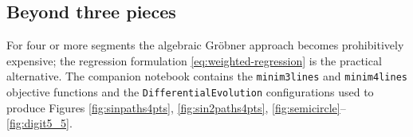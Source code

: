 \documentclass[12pt,english]{article}
\theoremstyle{remark}
\begin{document}
\subsection{Beyond three pieces}

For four or more segments the algebraic Gröbner approach becomes prohibitively
expensive; the regression formulation \eqref{eq:weighted-regression}
is the practical alternative. The companion notebook contains the
\texttt{minim3lines} and \texttt{minim4lines} objective functions
and the \texttt{DifferentialEvolution} configurations used to produce
Figures \ref{fig:sinpaths4pts}, \ref{fig:sin2paths4pts}, \ref{fig:semicircle}--\ref{fig:digit5_5}.
\end{document}

